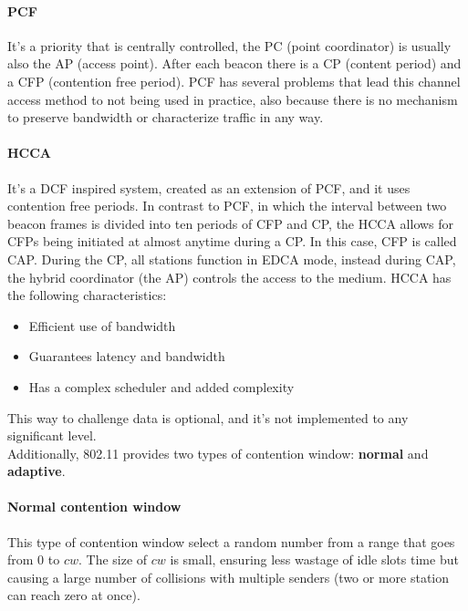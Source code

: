 \paragraph*{PCF} It's a priority that is centrally controlled, the PC (point
coordinator) is usually also the AP (access point).
After each beacon there is a CP (content period) and a CFP (contention free
period). PCF has several problems that lead this channel access method to not
being used in practice, also because there is no mechanism to preserve bandwidth
or characterize traffic in any way.

\paragraph*{HCCA} It's a DCF inspired system, created as an extension of PCF,
and it uses contention free periods. In contrast to PCF, in which the interval
between two beacon frames is divided into ten periods of CFP and CP, the HCCA
allows for CFPs being initiated at almost anytime during a CP. In this case,
CFP is called CAP. During the CP, all stations function in EDCA mode, instead
during CAP, the hybrid coordinator (the AP) controls the access to the medium.
HCCA has the following characteristics:
\begin{itemize}
\item Efficient use of bandwidth
\item Guarantees latency and bandwidth
\item Has a complex scheduler and added complexity
\end{itemize}

This way to challenge data is optional, and it's not implemented to any
significant level.\\[5pt]


\noindent Additionally, 802.11 provides two types of contention window:
\textbf{normal} and
\textbf{adaptive}.

\paragraph*{Normal contention window} This type of contention window select a
random number from a range that goes from 0 to $cw$. The size of $cw$ is small, ensuring less
wastage of idle slots time but causing a large number of collisions with
multiple senders (two or more station can reach zero at once).

